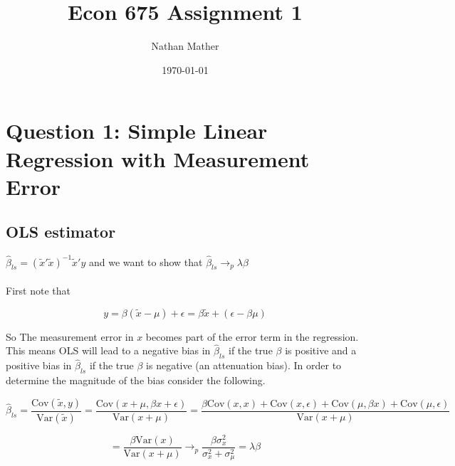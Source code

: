 \documentclass[11pt]{article}
\title{Econ 675 Assignment 1} %
\author{Nathan Mather} %
\date{\today} %
\newcommand{\Var}{\mathrm{Var}}
\newcommand{\Cov}{\mathrm{Cov}}
\begin{document}
	
\maketitle %

\setcounter{tocdepth}{2} %

\tableofcontents %



\section{Question 1: Simple Linear Regression with Measurement Error}
\subsection{OLS estimator}
$\hat{\beta}_{ls} = (\tilde{x}'\tilde{x})^{-1}\tilde{x}'y$ and we want to show that $\hat{\beta}_{ls} 	\rightarrow_{p} \lambda\beta$
\\
\\
First note that
 
\begin{displaymath}
y=\beta(\tilde{x}-\mu)+\epsilon = \beta\tilde{x} + (\epsilon-\beta\mu)
\end{displaymath}

So The measurement error in $x$ becomes part of the error term in the regression. This means OLS will lead to a negative bias in $\hat{\beta}_{ls}$ if the true $\beta$ is positive and a positive bias in $\hat{\beta}_{ls}$ if the true $\beta$ is negative (an attenuation bias). In order to determine the magnitude of the bias consider the following. 

$$\hat{\beta}_{ls} = \frac{\mathrm{Cov}(\tilde{x},y)}{\mathrm{Var}(\tilde{x})}  
 = \frac{\mathrm{Cov}(x + \mu, \beta x + \epsilon )}{\mathrm{Var}(x + \mu)} 
 = \frac{\beta \Cov(x,x) + \Cov(x,\epsilon) + \Cov(\mu, \beta x) + \Cov(\mu, \epsilon)}{\Var(x + \mu)}$$
 
 $$ = \frac{\beta \Var(x) }{\Var(x + \mu)} \rightarrow_{p} \frac{\beta \sigma_{x}^2}{\sigma_{x}^2 + \sigma_{\mu}^2} = \lambda \beta$$
 
\end{document}
